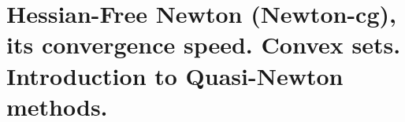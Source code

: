 \chapter{Hessian-Free Newton (Newton-cg), its convergence speed. Convex sets. Introduction to Quasi-Newton methods.}
